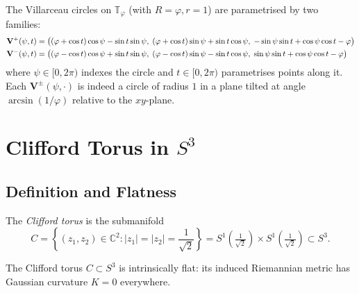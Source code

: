 The Villarceau circles on $\mathbb{T}_\varphi$ (with $R = \varphi, r = 1$) are parametrised by
two families:
\begin{align}\label{eq:villarceau-param}
  \mathbf{V}^+(\psi,t) &= \bigl((\varphi + \cos t)\cos\psi - \sin t\sin\psi,\;
                             (\varphi + \cos t)\sin\psi + \sin t\cos\psi,\;
                             -\sin\psi\sin t + \cos\psi\cos t - \varphi\bigr) \notag\\
  \mathbf{V}^-(\psi,t) &= \bigl((\varphi - \cos t)\cos\psi + \sin t\sin\psi,\;
                             (\varphi - \cos t)\sin\psi - \sin t\cos\psi,\;
                             \sin\psi\sin t + \cos\psi\cos t - \varphi\bigr)
\end{align}
where $\psi \in [0,2\pi)$ indexes the circle and $t \in [0,2\pi)$ parametrises
points along it.
Each $\mathbf{V}^\pm(\psi,\cdot)$ is indeed a circle of radius $1$ in a plane
tilted at angle $\arcsin(1/\varphi)$ relative to the $xy$-plane.

\section{Clifford Torus in \texorpdfstring{$S^3$}{S3}}
\label{sec:ch18-clifford}

\subsection{Definition and Flatness}\label{subsec:ch18-clifford-def}

\begin{definition}\label{def:clifford-torus}
The \emph{Clifford torus} is the submanifold
\begin{equation}\label{eq:clifford-torus}
  C = \left\{(z_1,z_2) \in \mathbb{C}^2 : |z_1| = |z_2| = \frac{1}{\sqrt{2}}\right\}
    = S^1\!\left(\tfrac{1}{\sqrt{2}}\right) \times S^1\!\left(\tfrac{1}{\sqrt{2}}\right)
    \subset S^3.
\end{equation}
\end{definition}

\begin{theorem}\label{thm:clifford-flat}
The Clifford torus $C \subset S^3$ is intrinsically flat: its induced Riemannian metric
has Gaussian curvature $K = 0$ everywhere.
\end{theorem}

